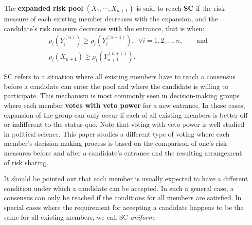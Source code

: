 \documentclass[fleqn,mnsc,nonblindrev]{informs4}
\begin{document}
\begin{definition}\label{def:strong_consensus}
The {\bf expanded risk pool} $(X_1, \cdots, X_{n+1})$ is said to reach {\bf SC} if the risk measure of each existing member decreases with the expansion, and the candidate's risk measure decreases with the entrance, that is when: 
\begin{equation}\label{eq:strong consensus}
\begin{aligned}
&\rho_i(Y_i^{(n)})\geq \rho_i(Y_i^{(n+1)}),\,\,\,  \forall i=1,2,...,n,\qquad\text{and }\\
&\rho_i(X_{n+1})\geq \rho_i(Y^{(n+1)}_{n+1}).
\end{aligned}
\end{equation}

\end{definition}

SC refers to a situation where all existing members have to reach a consensus before a candidate can enter the pool and where the candidate is willing to participate. This mechanism is most commonly seen in decision-making groups where each member  \textbf{votes with veto power} for a new entrance. In these cases, expansion of the group can only occur if each of all existing members is better off or indifferent to the status quo. Note that voting with veto power is well studied in political science. This paper studies a different type of voting where each member's decision-making process is based on the comparison of one's risk measures before and after a candidate's entrance and the resulting arrangement of risk sharing. 

It should be pointed out that each member is usually expected to have a different condition under which a candidate can be accepted. In such a general case, a consensus can only be reached if the conditions for all members are satisfied. In special cases where the requirement for accepting a candidate happens to be the same for all existing members, we call SC \textit{uniform}. 
\end{document}
